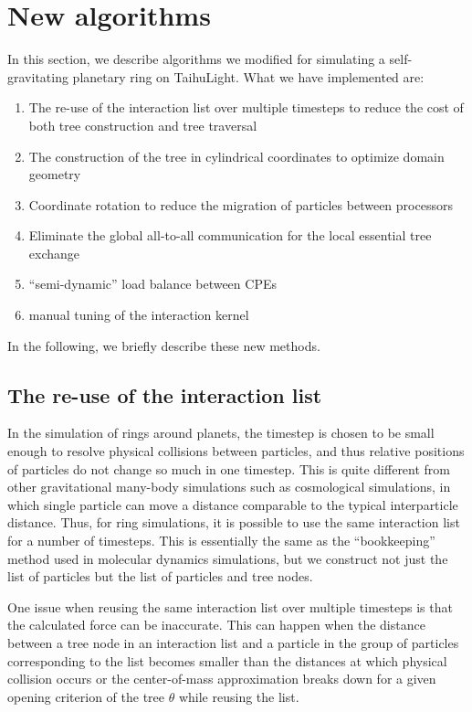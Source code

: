 \documentclass[oribibl]{llncs}
\begin{document}
\section{New algorithms}
\label{sec:impl1}

In this section, we describe algorithms we modified for simulating
a self-gravitating planetary ring on TaihuLight. What we have
implemented are:

\begin{enumerate}
\item The re-use of the interaction list over multiple timesteps to
  reduce the cost of both tree construction and tree traversal
\item The construction of the tree in cylindrical coordinates to optimize
  domain geometry
\item Coordinate rotation to reduce the migration of particles between
  processors
\item Eliminate the global all-to-all communication for the local
  essential tree exchange
\item ``semi-dynamic'' load balance between CPEs
\item manual tuning of the interaction kernel
\end{enumerate}  

In the following, we briefly describe these new methods.

\subsection{The re-use of the interaction list}
\label{subsec:list}

In the simulation of rings around planets, the timestep is chosen to
be small enough to resolve physical collisions between particles, and
thus relative positions of particles do not change so much in one
timestep. This is quite different from other gravitational many-body
simulations such as cosmological simulations, in which single particle
can move a distance comparable to the typical interparticle
distance. Thus, for ring simulations, it is possible to use the same
interaction list for a number of timesteps. This is essentially the
same as the ``bookkeeping'' method used in molecular dynamics
simulations, but we construct not just the list of particles but the
list of particles and tree nodes.

One issue when reusing the same interaction list over multiple timesteps is that the calculated force can be inaccurate. This can happen when the distance between a tree node in an interaction list and a particle in the group of particles corresponding to the list becomes smaller than the distances at which  physical collision occurs or the center-of-mass approximation breaks down for a given opening criterion of the tree $\theta$ while reusing the list.
\end{document}
